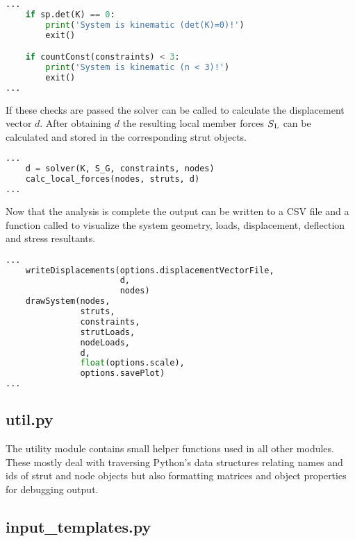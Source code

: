 \begin{inconsolata}
\begin{lstlisting}[language=python]
...
    if sp.det(K) == 0:
        print('System is kinematic (det(K)=0)!')
        exit()

    if countConst(constraints) < 3:
        print('System is kinematic (n < 3)!')
        exit()
...
\end{lstlisting}
\end{inconsolata}

If these checks are passed the solver can be called to calculate the displacement vector $d$.
After obtaining $d$ the resulting local member forces $S\textsubscript{L}$ can be calculated and stored in the corresponding strut objects.

\begin{inconsolata}
\begin{lstlisting}[language=python]
...
    d = solver(K, S_G, constraints, nodes)
    calc_local_forces(nodes, struts, d)
...
\end{lstlisting}
\end{inconsolata}

Now that the analysis is complete the output can be written to a CSV file and a function called to visualize the system geometry, loads, displacement, deflection and stress resultants.

\begin{inconsolata}
\begin{lstlisting}[language=python]
...
    writeDisplacements(options.displacementVectorFile,
                       d,
                       nodes)
    drawSystem(nodes,
               struts,
               constraints,
               strutLoads,
               nodeLoads,
               d,
               float(options.scale),
               options.savePlot)
...
\end{lstlisting}
\end{inconsolata}


\subsection{util.py}
\label{subsec:util.py}

The utility module contains small helper functions used in all other modules.
These mostly deal with traversing Python's data structures relating names and ids of strut and node objects but also formatting matrices and object properties for debugging output.

\subsection{input\_templates.py}
\label{subsec:inputtemplates.py}


